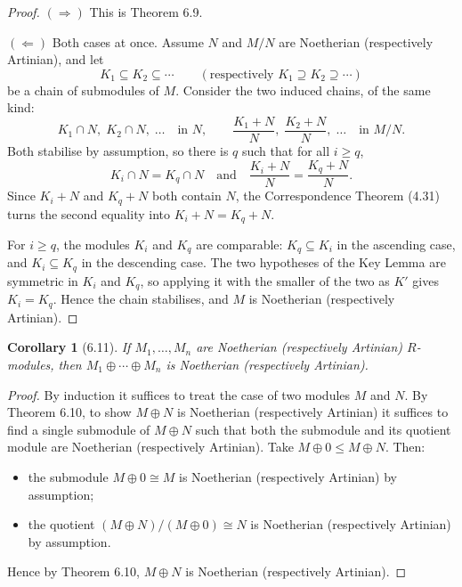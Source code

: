 \documentclass[12pt]{article}
\newtheorem{corollary}{Corollary}
\begin{document}
\begin{proof}
$(\Rightarrow)$ This is Theorem 6.9.

$(\Leftarrow)$ Both cases at once. Assume $N$ and $M/N$ are Noetherian (respectively Artinian), and let
\[
  K_1 \subseteq K_2 \subseteq \cdots \qquad (\text{respectively } K_1 \supseteq K_2 \supseteq \cdots)
\]
be a chain of submodules of $M$. Consider the two induced chains, of the same kind:
\[
  K_1 \cap N,\; K_2 \cap N,\; \ldots \quad \text{in } N, \qquad \frac{K_1 + N}{N},\; \frac{K_2 + N}{N},\; \ldots \quad \text{in } M/N.
\]
Both stabilise by assumption, so there is $q$ such that for all $i \geq q$,
\[
  K_i \cap N = K_q \cap N \quad \text{and} \quad \frac{K_i + N}{N} = \frac{K_q + N}{N}.
\]
Since $K_i + N$ and $K_q + N$ both contain $N$, the Correspondence Theorem (4.31) turns the second equality into $K_i + N = K_q + N$.

For $i \geq q$, the modules $K_i$ and $K_q$ are comparable: $K_q \subseteq K_i$ in the ascending case, and $K_i \subseteq K_q$ in the descending case. The two hypotheses of the Key Lemma are symmetric in $K_i$ and $K_q$, so applying it with the smaller of the two as $K'$ gives $K_i = K_q$. Hence the chain stabilises, and $M$ is Noetherian (respectively Artinian).
\end{proof}


\begin{corollary}[6.11]
If $M_1, \ldots, M_n$ are Noetherian (respectively Artinian) $R$-modules, then $M_1 \oplus \cdots \oplus M_n$ is Noetherian (respectively Artinian).
\end{corollary}

\begin{proof}
By induction it suffices to treat the case of two modules $M$ and $N$. By Theorem 6.10, to show $M \oplus N$ is Noetherian (respectively Artinian) it suffices to find a single submodule of $M \oplus N$ such that both the submodule and its quotient module are Noetherian (respectively Artinian). Take $M \oplus 0 \leq M \oplus N$. Then:
\begin{itemize}
  \item the submodule $M \oplus 0 \cong M$ is Noetherian (respectively Artinian) by assumption;
  \item the quotient $(M \oplus N)/(M \oplus 0) \cong N$ is Noetherian (respectively Artinian) by assumption.
\end{itemize}
Hence by Theorem 6.10, $M \oplus N$ is Noetherian (respectively Artinian).
\end{proof}
\end{document}
